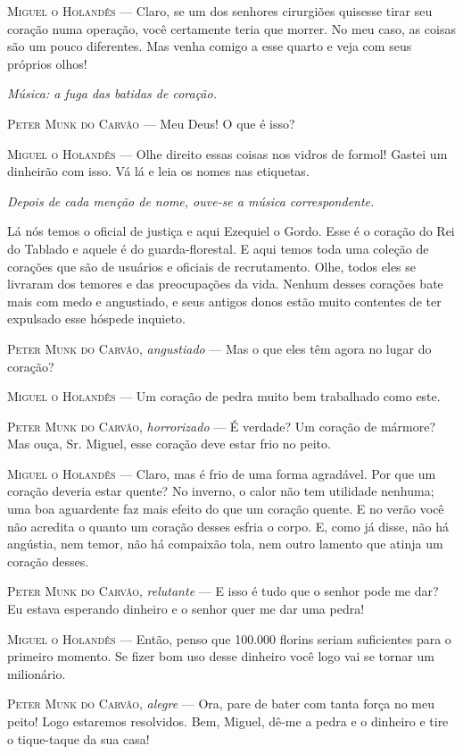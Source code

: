 \begin{myparindent}{0pt}
\begin{Parskip}
\textsc{Miguel o Holandês} --- Claro, se um dos senhores cirurgiões quisesse tirar
seu coração numa operação, você certamente teria que morrer. No meu
caso, as coisas são um pouco diferentes. Mas venha comigo a esse quarto
e veja com seus próprios olhos!

\emph{Música: a fuga das batidas de coração.}

\textsc{Peter Munk do Carvão} --- Meu Deus! O que é isso?

\textsc{Miguel o Holandês} --- Olhe direito essas coisas nos vidros de formol!
Gastei um dinheirão com isso. Vá lá e leia os nomes nas etiquetas.

\emph{Depois de cada menção de nome, ouve-se a música correspondente.}

Lá nós temos o oficial de justiça e aqui Ezequiel o Gordo. Esse é o
coração do Rei do Tablado e aquele é do guarda-florestal. E aqui temos
toda uma coleção de corações que são de usuários e oficiais de
recrutamento. Olhe, todos eles se livraram dos temores e das
preocupações da vida. Nenhum desses corações bate mais com medo e
angustiado, e seus antigos donos estão muito contentes de ter expulsado
esse hóspede inquieto.

\textsc{Peter Munk do Carvão}, \emph{angustiado} --- Mas o que eles têm agora no
lugar do coração?

\textsc{Miguel o Holandês} --- Um coração de pedra muito bem trabalhado como este.

\textsc{Peter Munk do Carvão}, \emph{horrorizado} --- É verdade? Um coração de
mármore? Mas ouça, Sr. Miguel, esse coração deve estar frio no peito.

\textsc{Miguel o Holandês} --- Claro, mas é frio de uma forma agradável. Por que
um coração deveria estar quente? No inverno, o calor não tem utilidade
nenhuma; uma boa aguardente faz mais efeito do que um coração quente. E
no verão você não acredita o quanto um coração desses esfria o corpo. E,
como já disse, não há angústia, nem temor, não há compaixão tola, nem
outro lamento que atinja um coração desses.

\textsc{Peter Munk do Carvão}, \emph{relutante} --- E isso é tudo que o senhor
pode me dar? Eu estava esperando dinheiro e o senhor quer me dar uma
pedra!

\textsc{Miguel o Holandês} --- Então, penso que 100.000 florins seriam suficientes
para o primeiro momento. Se fizer bom uso desse dinheiro você logo vai
se tornar um milionário.

\textsc{Peter Munk do Carvão}, \emph{alegre} --- Ora, pare de bater com tanta
força no meu peito! Logo estaremos resolvidos. Bem, Miguel, dê-me a
pedra e o dinheiro e tire o tique-taque da sua casa!


\end{Parskip}
\end{myparindent}

